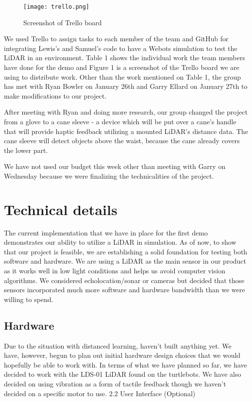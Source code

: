 \documentclass{article}
\begin{document}
\begin{figure*}[h]
\begin{center}
  \texttt{[image: trello.png]}
  \caption{Screenshot of Trello board}
   \end{center}
\end{figure*}
We used Trello to assign tasks to each member of the team and GitHub for integrating Lewis’s and Samuel’s code to have a Webots simulation to test the LiDAR in an environment. Table 1 shows the individual work the team members have done for the demo and Figure 1 is a screenshot of the Trello board we are using to distribute work. Other than the work mentioned on Table 1, the group has met with Ryan Bowler on January 26th and Garry Ellard on January 27th to make modifications to our project.

After meeting with Ryan and doing more research, our group changed the project from a glove to a cane sleeve - a device which will be put over a cane's handle that will provide haptic feedback utilizing a mounted LiDAR's distance data. The cane sleeve will detect objects above the waist, because the cane already covers the lower part. 

We have not used our budget this week other than meeting with Garry on Wednesday because we were finalizing the technicalities of the project.


\section{Technical details}

The current implementation that we have in place for the first demo demonstrates our ability to utilize a LiDAR in simulation. As of now, to show that our project is feasible, we are establishing a solid foundation for testing both software and hardware. We are using a LiDAR as the main sensor in our product as it works well in low light conditions and helps us avoid computer vision algorithms. We considered echolocation/sonar or cameras but decided that those sensors incorporated much more software and hardware bandwidth than we were willing to spend.
\subsection{ Hardware}
Due to the situation with distanced learning, haven't built anything yet. We have, however, begun to plan out initial hardware design choices that we would hopefully be able to work with. In terms of what we have planned so far, we have decided to work with the LDS-01 LiDAR found on the turtlebots. We have also decided on using vibration as a form of tactile feedback though we haven't decided on a specific motor to use.
2.2 User Interface (Optional)
\end{document}
